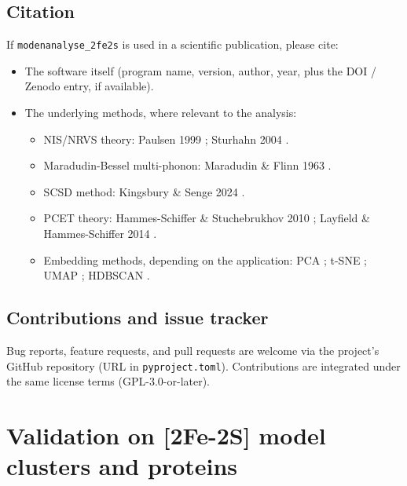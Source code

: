 \documentclass[11pt,a4paper,twoside]{article}
\theoremstyle{remark}
\begin{document}
\subsection{Citation}

If \texttt{modenanalyse\_2fe2s} is used in a scientific
publication, please cite:

\begin{itemize}
  \item The software itself (program name, version, author, year,
        plus the DOI / Zenodo entry, if available).
  \item The underlying methods, where relevant to the analysis:
        \begin{itemize}
          \item NIS/NRVS theory: Paulsen 1999 \cite{Paulsen1999};
                Sturhahn 2004 \cite{Sturhahn2004}.
          \item Maradudin-Bessel multi-phonon: Maradudin \&
                Flinn 1963 \cite{MaradudinFlinn1963}.
          \item SCSD method: Kingsbury \& Senge 2024
                \cite{Kingsbury2024}.
          \item PCET theory: Hammes-Schiffer \&
                Stuchebrukhov 2010 \cite{HammesSchiffer2010};
                Layfield \& Hammes-Schiffer 2014
                \cite{LayfieldHammesSchiffer2014}.
          \item Embedding methods, depending on the application:
                PCA \cite{Pearson1901}; t-SNE
                \cite{vanDerMaaten2008}; UMAP
                \cite{McInnes2018}; HDBSCAN \cite{Campello2013}.
        \end{itemize}
\end{itemize}

\subsection{Contributions and issue tracker}

Bug reports, feature requests, and pull requests are welcome via
the project's GitHub repository (URL in \texttt{pyproject.toml}).
Contributions are integrated under the same license terms
(GPL-3.0-or-later).


\section{Validation on [2Fe-2S] model clusters and proteins}
\label{sec:validierung}
\end{document}
